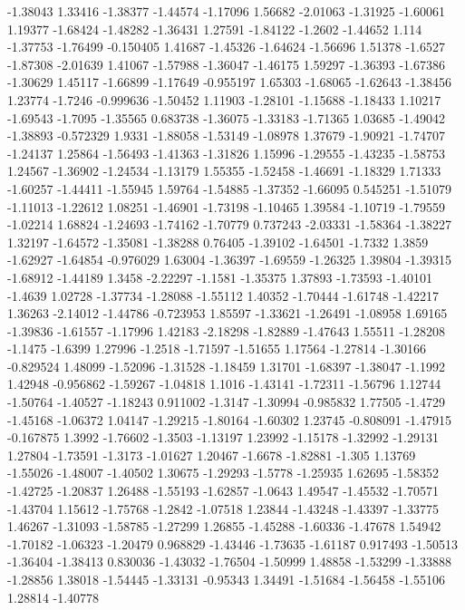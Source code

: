 \documentclass[9pt]{article}
\theoremstyle{plain}
\theoremstyle{definition}
\theoremstyle{remark}
\numberwithin{equation}{section}
\begin{document}
-1.38043
1.33416
-1.38377
-1.44574
-1.17096
1.56682
-2.01063
-1.31925
-1.60061
1.19377
-1.68424
-1.48282
-1.36431
1.27591
-1.84122
-1.2602
-1.44652
1.114
-1.37753
-1.76499
-0.150405
1.41687
-1.45326
-1.64624
-1.56696
1.51378
-1.6527
-1.87308
-2.01639
1.41067
-1.57988
-1.36047
-1.46175
1.59297
-1.36393
-1.67386
-1.30629
1.45117
-1.66899
-1.17649
-0.955197
1.65303
-1.68065
-1.62643
-1.38456
1.23774
-1.7246
-0.999636
-1.50452
1.11903
-1.28101
-1.15688
-1.18433
1.10217
-1.69543
-1.7095
-1.35565
0.683738
-1.36075
-1.33183
-1.71365
1.03685
-1.49042
-1.38893
-0.572329
1.9331
-1.88058
-1.53149
-1.08978
1.37679
-1.90921
-1.74707
-1.24137
1.25864
-1.56493
-1.41363
-1.31826
1.15996
-1.29555
-1.43235
-1.58753
1.24567
-1.36902
-1.24534
-1.13179
1.55355
-1.52458
-1.46691
-1.18329
1.71333
-1.60257
-1.44411
-1.55945
1.59764
-1.54885
-1.37352
-1.66095
0.545251
-1.51079
-1.11013
-1.22612
1.08251
-1.46901
-1.73198
-1.10465
1.39584
-1.10719
-1.79559
-1.02214
1.68824
-1.24693
-1.74162
-1.70779
0.737243
-2.03331
-1.58364
-1.38227
1.32197
-1.64572
-1.35081
-1.38288
0.76405
-1.39102
-1.64501
-1.7332
1.3859
-1.62927
-1.64854
-0.976029
1.63004
-1.36397
-1.69559
-1.26325
1.39804
-1.39315
-1.68912
-1.44189
1.3458
-2.22297
-1.1581
-1.35375
1.37893
-1.73593
-1.40101
-1.4639
1.02728
-1.37734
-1.28088
-1.55112
1.40352
-1.70444
-1.61748
-1.42217
1.36263
-2.14012
-1.44786
-0.723953
1.85597
-1.33621
-1.26491
-1.08958
1.69165
-1.39836
-1.61557
-1.17996
1.42183
-2.18298
-1.82889
-1.47643
1.55511
-1.28208
-1.1475
-1.6399
1.27996
-1.2518
-1.71597
-1.51655
1.17564
-1.27814
-1.30166
-0.829524
1.48099
-1.52096
-1.31528
-1.18459
1.31701
-1.68397
-1.38047
-1.1992
1.42948
-0.956862
-1.59267
-1.04818
1.1016
-1.43141
-1.72311
-1.56796
1.12744
-1.50764
-1.40527
-1.18243
0.911002
-1.3147
-1.30994
-0.985832
1.77505
-1.4729
-1.45168
-1.06372
1.04147
-1.29215
-1.80164
-1.60302
1.23745
-0.808091
-1.47915
-0.167875
1.3992
-1.76602
-1.3503
-1.13197
1.23992
-1.15178
-1.32992
-1.29131
1.27804
-1.73591
-1.3173
-1.01627
1.20467
-1.6678
-1.82881
-1.305
1.13769
-1.55026
-1.48007
-1.40502
1.30675
-1.29293
-1.5778
-1.25935
1.62695
-1.58352
-1.42725
-1.20837
1.26488
-1.55193
-1.62857
-1.0643
1.49547
-1.45532
-1.70571
-1.43704
1.15612
-1.75768
-1.2842
-1.07518
1.23844
-1.43248
-1.43397
-1.33775
1.46267
-1.31093
-1.58785
-1.27299
1.26855
-1.45288
-1.60336
-1.47678
1.54942
-1.70182
-1.06323
-1.20479
0.968829
-1.43446
-1.73635
-1.61187
0.917493
-1.50513
-1.36404
-1.38413
0.830036
-1.43032
-1.76504
-1.50999
1.48858
-1.53299
-1.33888
-1.28856
1.38018
-1.54445
-1.33131
-0.95343
1.34491
-1.51684
-1.56458
-1.55106
1.28814
-1.40778
\end{document}
